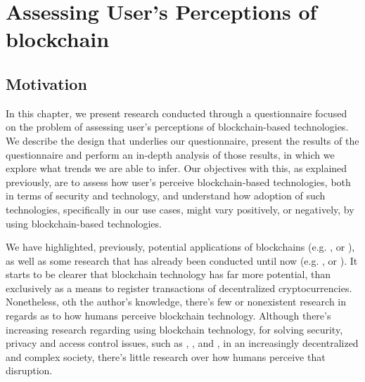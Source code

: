 
\chapter{Assessing User's Perceptions of blockchain}

\section{Motivation}

In this chapter, we present research conducted through a questionnaire focused on the problem of assessing user's perceptions of blockchain-based technologies. We describe the design that underlies our questionnaire, present the results of the questionnaire and perform an in-depth analysis of those results, in which we explore what trends we are able to infer. Our objectives with this, as explained previously, are to assess how user's perceive blockchain-based technologies, both in terms of security and technology, and understand how adoption of such technologies, specifically in our use cases, might vary positively, or negatively, by using blockchain-based technologies.

We have highlighted, previously, potential applications of blockchains (e.g. \cite{pilkington_blockchain_2016}, \cite{crosby_blockchain_2016} or \cite{underwood_blockchain_2016}), as well as some research that has already been conducted until now (e.g. \cite{biswas_securing_2016}, \cite{ouaddah_fairaccess:_2017} or \cite{fotiou_decentralized_2016}). It starts to be clearer that blockchain technology has far more potential, than exclusively as a means to register transactions of decentralized cryptocurrencies. Nonetheless, oth the author's knowledge, there's few or nonexistent research in regards as to how humans perceive blockchain technology. Although there's increasing research regarding using blockchain technology, for solving security, privacy and access control issues, such as \cite{maesa_blockchain_2017}, \cite{ouaddah_access_2017}, \cite{dorri_blockchain_2017} and \cite{yue_healthcare_2016}, in an increasingly decentralized and complex society, there's little research over how humans perceive that disruption.
  

